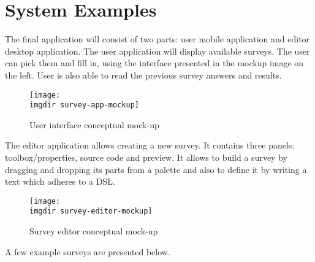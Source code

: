 \chapter{System Examples}
\label{chap:examples}
The final application will consist of two parts: user mobile application and editor desktop application.
The user application will display available surveys. The user can pick them and fill in, using the interface presented in the mockup image on the left. User is also able to read the previous survey answers and results. 
\begin{figure}
  \centering
  \texttt{[image: \\imgdir survey-app-mockup]}
  \label{fig:survey-app-mockup}
  \caption{User interface conceptual mock-up}
\end{figure}

The editor application allows creating a new survey. It contains three panels: toolbox/properties, source code and preview. It allows to build a survey by dragging and dropping its parts from a palette and also to define it by writing a text which adheres to a DSL.

\begin{figure}
  \centering
  \texttt{[image: \\imgdir survey-editor-mockup]}
  \label{fig:survey-editor-mockup}
  \caption{Survey editor conceptual mock-up}
\end{figure}

A few example surveys are presented below.
